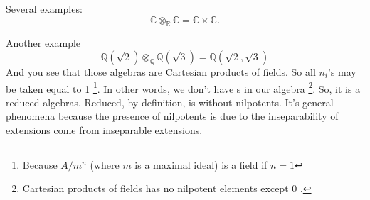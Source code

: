 Several examples:
\[
\mathbb{C} \otimes_\mathbb{R} \mathbb{C} =
\mathbb{C} \times \mathbb{C}.
\]

Another example
\[
\mathbb{Q}\left(\sqrt{2}\right)
\otimes_{\mathbb{Q}}
\mathbb{Q}\left(\sqrt{3}\right) =
\mathbb{Q}\left(\sqrt{2}, \sqrt{3}\right)
\]
And you see that those algebras are Cartesian products of fields.
So all $n_i$'s may be taken equal to 1
\footnote{
  Because $A/m^n$ (where $m$ is a maximal ideal) is a field if $n=1$
}.
In other words, we don't have
s in our algebra
\footnote{
  Cartesian products of fields has no nilpotent elements except 0
  \cite{ribenboim2001classical}.
}. So, it is a reduced
algebras. Reduced, by definition, is without nilpotents.     
It's general phenomena because the presence of nilpotents is due to the
inseparability of extensions come from inseparable extensions.  
